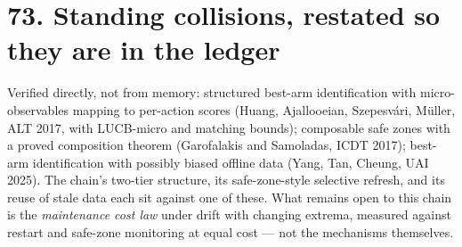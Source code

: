 \documentclass[9pt,twocolumn]{article}
\renewcommand{\_}{\CIGunderscore\allowbreak}
\begin{document}
\section*{73. Standing collisions, restated so they are in the ledger}
Verified directly, not from memory: structured best-arm identification with micro-observables mapping to per-action scores (Huang, Ajallooeian, Szepesv\'ari, M\"uller, ALT 2017, with LUCB-micro and matching bounds); composable safe zones with a proved composition theorem (Garofalakis and Samoladas, ICDT 2017); best-arm identification with possibly biased offline data (Yang, Tan, Cheung, UAI 2025). The chain's two-tier structure, its safe-zone-style selective refresh, and its reuse of stale data each sit against one of these. What remains open to this chain is the \emph{maintenance cost law} under drift with changing extrema, measured against restart and safe-zone monitoring at equal cost --- not the mechanisms themselves.
\end{document}
